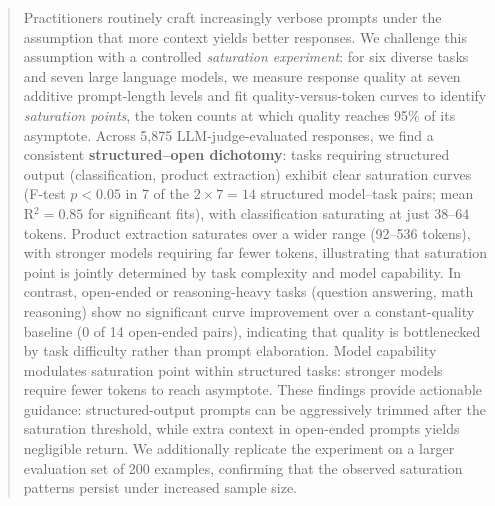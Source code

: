 \begin{abstract}
Practitioners routinely craft increasingly verbose prompts under the assumption
that more context yields better responses.
We challenge this assumption with a controlled \emph{saturation experiment}:
for six diverse tasks and seven large language models, we measure response
quality at seven additive prompt-length levels and fit quality-versus-token
curves to identify \emph{saturation points}, the token counts at which
quality reaches 95\% of its asymptote.
Across 5,875 LLM-judge-evaluated responses, we find a consistent
\textbf{structured--open dichotomy}: tasks requiring structured output
(classification, product extraction) exhibit clear saturation curves
(F-test $p < 0.05$ in 7 of the $2 \times 7 = 14$ structured model--task
pairs; mean R$^2 = 0.85$ for significant fits), with classification
saturating at just 38--64 tokens.
Product extraction saturates over a wider range (92--536 tokens), with
stronger models requiring far fewer tokens, illustrating that saturation
point is jointly determined by task complexity and model capability.
In contrast, open-ended or reasoning-heavy tasks (question answering, math
reasoning) show no significant curve improvement over a constant-quality baseline
(0 of 14 open-ended pairs), indicating that quality is bottlenecked by task difficulty
rather than prompt elaboration.
Model capability modulates saturation point within structured tasks: stronger
models require fewer tokens to reach asymptote.
These findings provide actionable guidance: structured-output prompts can be
aggressively trimmed after the saturation threshold, while extra context in
open-ended prompts yields negligible return.
We additionally replicate the experiment on a larger evaluation set of 200
examples, confirming that the observed saturation patterns persist under
increased sample size.
\end{abstract}
